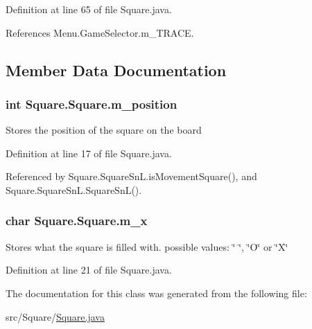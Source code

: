 Definition at line 65 of file Square.\+java.



References Menu.\+Game\+Selector.\+m\+\_\+\+T\+R\+A\+C\+E.



\subsection{Member Data Documentation}
\hypertarget{class_square_1_1_square_a459ef3208bfff1bc1a693a335c2cd5e5}{}
\subsubsection[{m\+\_\+position}]{\setlength{\rightskip}{0pt plus 5cm}int Square.\+Square.\+m\+\_\+position\hspace{0.3cm}{\ttfamily [protected]}}\label{class_square_1_1_square_a459ef3208bfff1bc1a693a335c2cd5e5}
Stores the position of the square on the board 

Definition at line 17 of file Square.\+java.



Referenced by Square.\+Square\+Sn\+L.\+is\+Movement\+Square(), and Square.\+Square\+Sn\+L.\+Square\+Sn\+L().

\hypertarget{class_square_1_1_square_a9e0779af7f8cbe54b28f95bb4a5d165a}{}
\subsubsection[{m\+\_\+x}]{\setlength{\rightskip}{0pt plus 5cm}char Square.\+Square.\+m\+\_\+x\hspace{0.3cm}{\ttfamily [protected]}}\label{class_square_1_1_square_a9e0779af7f8cbe54b28f95bb4a5d165a}
Stores what the square is filled with. possible values\+: \char`\"{} \char`\"{}, \char`\"{}\+O\char`\"{} or \char`\"{}\+X\char`\"{} 

Definition at line 21 of file Square.\+java.



The documentation for this class was generated from the following file\+:\begin{DoxyCompactItemize}
\item 
src/\+Square/\hyperlink{_square_8java}{Square.\+java}\end{DoxyCompactItemize}
